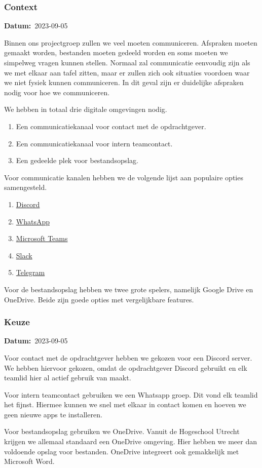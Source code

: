\documentclass[a4paper]{report}
\newcommand{\timestamp}[1]{
  \mbox{\scriptsize \textbf{Datum:} #1} \smallbreak
}
\begin{document}
\subsubsection{Context}
\timestamp{2023-09-05}
Binnen ons projectgroep zullen we veel moeten communiceren. Afspraken moeten gemaakt worden, bestanden moeten gedeeld worden en soms moeten we simpelweg vragen kunnen stellen.
Normaal zal communicatie eenvoudig zijn als we met elkaar aan tafel zitten, maar er zullen zich ook situaties voordoen waar we niet fysiek kunnen communiceren.
In dit geval zijn er duidelijke afspraken nodig voor hoe we communiceren.
\par \smallskip 
We hebben in totaal drie digitale omgevingen nodig.
\begin{enumerate}
  \item Een communicatiekanaal voor contact met de opdrachtgever.
  \item Een communicatiekanaal voor intern teamcontact.
  \item Een gedeelde plek voor bestandsopslag.
\end{enumerate}

Voor communicatie kanalen hebben we de volgende lijst aan populaire opties samengesteld.
\begin{enumerate}
  \item \href{https://discord.com/}{Discord}
  \item \href{https://www.whatsapp.com/}{WhatsApp}
  \item \href{https://www.microsoft.com/en-us/microsoft-teams/group-chat-software}{Microsoft Teams}
  \item \href{https://slack.com/}{Slack}
  \item \href{https://telegram.org/}{Telegram}
\end{enumerate}

Voor de bestandsopslag hebben we twee grote spelers, namelijk Google Drive en OneDrive. 
Beide zijn goede opties met vergelijkbare features.

\subsubsection{Keuze}
\timestamp{2023-09-05}
Voor contact met de opdrachtgever hebben we gekozen voor een Discord server.
We hebben hiervoor gekozen, omdat de opdrachtgever Discord gebruikt en elk teamlid hier al actief gebruik van maakt.
\par \smallskip 
Voor intern teamcontact gebruiken we een Whatsapp groep. Dit vond elk teamlid het fijnst. Hiermee kunnen we snel met elkaar in contact komen en hoeven we geen nieuwe apps te installeren. 
\par \smallskip
Voor bestandsopslag gebruiken we OneDrive. Vanuit de Hogeschool Utrecht krijgen we allemaal standaard een OneDrive omgeving.
Hier hebben we meer dan voldoende opslag voor bestanden. OneDrive integreert ook gemakkelijk met Microsoft Word. 
\end{document}
